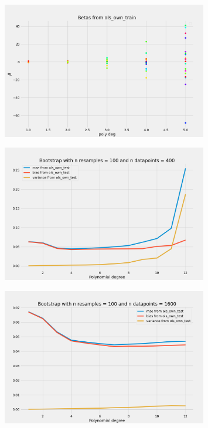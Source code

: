 \begin{figure}[H]
    \centering
    \includegraphics[width=0.8\textwidth]{Figures/b_beta.png}
\end{figure}




\begin{figure}[H]
    \centering
    \includegraphics[width=0.8\textwidth]{Figures/c_bootstrap_ols_n_data_400.png}
\end{figure}


\begin{figure}[H]
    \centering
    \includegraphics[width=0.8\textwidth]{Figures/c_bootstrap_ols_n_data_1600.png}
\end{figure}

